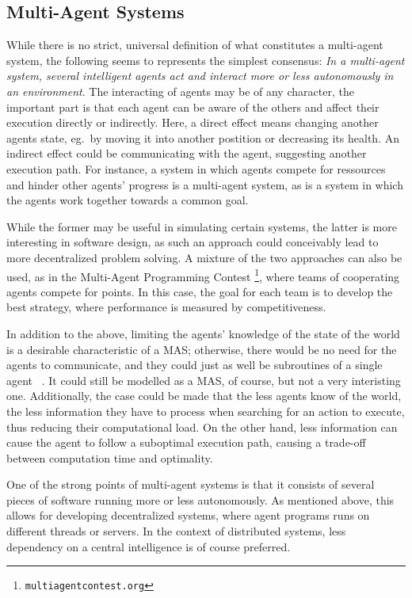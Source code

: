 \subsection{Multi-Agent Systems}

While there is no strict, universal definition of what constitutes
a multi-agent system, the following seems to represents the simplest
consensus: \emph{In a multi-agent system, several intelligent agents
act and interact more or less autonomously in an environment}. The
interacting of agents may be of any character, the important part
is that each agent can be aware of the others and affect their execution
directly or indirectly. Here, a direct effect means changing another
agents state, eg.\ by moving it into another postition or decreasing
its health. An indirect effect could be communicating with the agent,
suggesting another execution path. For instance, a system in which
agents compete for ressources and hinder other agents' progress is
a multi-agent system, as is a system in which the agents work together
towards a common goal. 

While the former may be useful in simulating certain systems, the
latter is more interesting in software design, as such an approach
could conceivably lead to more decentralized problem solving. A mixture
of the two approaches can also be used, as in the Multi-Agent Programming
Contest\texttt{\emph{}}%
\footnote{\texttt{multiagentcontest.org}%
}, where teams of cooperating agents compete for points. In this case,
the goal for each team is to develop the best strategy, where performance
is measured by competitiveness.

In addition to the above, limiting the agents' knowledge of the state
of the world is a desirable characteristic of a MAS; otherwise, there
would be no need for the agents to communicate, and they could just
as well be subroutines of a single agent ~\cite{Panait05}. It could
still be modelled as a MAS, of course, but not a very interisting
one. Additionally, the case could be made that the less agents know
of the world, the less information they have to process when searching
for an action to execute, thus reducing their computational load.
On the other hand, less information can cause the agent to follow
a suboptimal execution path, causing a trade-off between computation
time and optimality. 

One of the strong points of multi-agent systems is that it consists
of several pieces of software running more or less autonomously. As
mentioned above, this allows for developing decentralized systems,
where agent programs runs on different threads or servers. In the
context of distributed systems, less dependency on a central intelligence
is of course preferred. 

